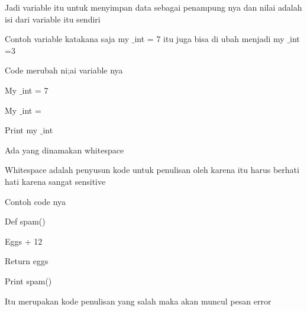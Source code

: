 		
{\fontsize{14pt}{14pt}\selectfont Jadi variable itu untuk menyimpan data sebagai penampung nya dan nilai adalah isi dari variable itu sendiri \\} \par
\vspace{14pt}
\noindent 
{\fontsize{14pt}{14pt}\selectfont Contoh variable katakana saja my $  \_  $int = 7 itu juga bisa di ubah menjadi my $  \_  $int =3  \\} \par
\vspace{14pt}
\noindent 
{\fontsize{14pt}{14pt}\selectfont Code merubah ni;ai variable nya  \\} \par
\noindent 
{\fontsize{14pt}{14pt}\selectfont My $  \_  $int = 7 \\} \par
\noindent 
{\fontsize{14pt}{14pt}\selectfont My $  \_  $int = \\} \par
\noindent 
{\fontsize{14pt}{14pt}\selectfont Print my $  \_  $int \\} \par
\vspace{14pt}
\noindent 
{\fontsize{14pt}{14pt}\selectfont Ada yang dinamakan whitespace  \\} \par
\vspace{14pt}
\noindent 
{\fontsize{14pt}{14pt}\selectfont Whitespace adalah penyusun kode untuk penulisan oleh karena itu harus berhati hati karena sangat sensitive \\} \par
\vspace{14pt}
\noindent 
{\fontsize{14pt}{14pt}\selectfont Contoh code nya  \\} \par
\noindent 
{\fontsize{14pt}{14pt}\selectfont Def spam() \\} \par
\noindent 
{\fontsize{14pt}{14pt}\selectfont Eggs + 12 \\} \par
\noindent 
{\fontsize{14pt}{14pt}\selectfont Return eggs \\} \par
\noindent 
{\fontsize{14pt}{14pt}\selectfont Print spam() \\} \par
\vspace{14pt}
\noindent 
{\fontsize{14pt}{14pt}\selectfont Itu merupakan kode penulisan yang salah maka akan muncul pesan error \\} \par
